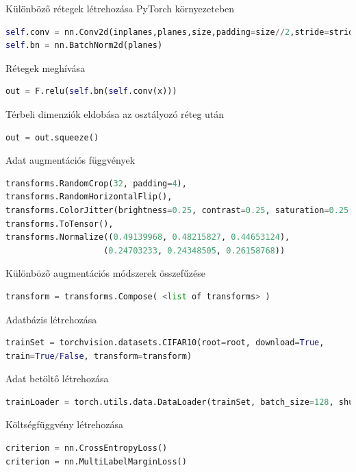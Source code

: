 \documentclass[12pt,a4paper,oneside]{report}             %
\begin{document}
Különböző rétegek létrehozása PyTorch környezeteben

\begin{lstlisting}[language=Python]
self.conv = nn.Conv2d(inplanes,planes,size,padding=size//2,stride=stride)
self.bn = nn.BatchNorm2d(planes)
\end{lstlisting}

Rétegek meghívása

\begin{lstlisting}[language=Python]
out = F.relu(self.bn(self.conv(x)))
\end{lstlisting}

Térbeli dimenziók eldobása az osztályozó réteg után

\begin{lstlisting}[language=Python]
out = out.squeeze()
\end{lstlisting}

Adat augmentációs függvények

\begin{lstlisting}[language=Python]
transforms.RandomCrop(32, padding=4),
transforms.RandomHorizontalFlip(),
transforms.ColorJitter(brightness=0.25, contrast=0.25, saturation=0.25, hue=0.2),
transforms.ToTensor(),
transforms.Normalize((0.49139968, 0.48215827, 0.44653124),
					(0.24703233, 0.24348505, 0.26158768))
\end{lstlisting}

Különböző augmentációs módszerek összefűzése

\begin{lstlisting}[language=Python]
transform = transforms.Compose( <list of transforms> )
\end{lstlisting}

Adatbázis létrehozása

\begin{lstlisting}[language=Python]
trainSet = torchvision.datasets.CIFAR10(root=root, download=True,
train=True/False, transform=transform)
\end{lstlisting}

Adat betöltő létrehozása

\begin{lstlisting}[language=Python]
trainLoader = torch.utils.data.DataLoader(trainSet, batch_size=128, shuffle=True, num_workers=2)
\end{lstlisting}

Költségfüggvény létrehozása

\begin{lstlisting}[language=Python]
criterion = nn.CrossEntropyLoss()
criterion = nn.MultiLabelMarginLoss()
\end{lstlisting}
\end{document}
